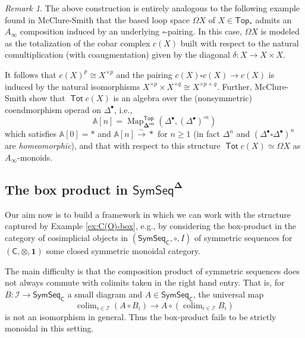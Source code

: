 \documentclass[11pt]{amsart}
\theoremstyle{definition}
\theoremstyle{remark}
\newtheorem{remark}[subsection]{Remark}
\newcommand{\Top}{\mathsf{Top}_*}
\newcommand{\Tot}{\operatorname{\mathsf{Tot}}}
\newcommand{\SymSeq}{\mathsf{SymSeq}}
\newcommand{\Map}{\operatorname{Map}}
\newcommand{\colim}{\operatorname{colim}}
\newcommand{\pt}{*}
\newcommand{\bdel}{\mathbf{\Delta}}
\newcommand{\Dres}{\bdel^{\mathsf{res}}}
\begin{document}
\begin{remark}
    The above construction is entirely analogous to the following example found in McClure-Smith \cite{MS-box} that the based loop space $\Omega X$ of $X\in \Top$ admits an $A_{\infty}$ composition induced by an underlying $\square$-pairing. In this case, $\Omega X$ is modeled as the totalization of the cobar complex $c(X)$ built with respect to the natural comultiplication (with coaugmentation) given by the diagonal $\delta\colon X\to X\times X$. 
    
    It follows that $c(X)^{p}\cong X^{\times p}$ and the pairing $c(X)\square c(X)\to c(X)$ is induced by the natural isomorphisms $X^{\times p}\times X^{\times q}\cong X^{\times p+q}$. Further, McClure-Smith  show that $\Tot c(X)$ is an algebra over the (nonsymmetric) coendmorphism operad on $\Delta^{\bullet}$, i.e., \[ \mathbb{A}[n]=\Map_{\Dres}^{\mathsf{Top}}\left(\Delta^{\bullet}, (\Delta^{\bullet})^{\square n} \right)\] which satisfies $\mathbb{A}[0]=\pt$ and $\mathbb{A}[n]\xrightarrow{\sim} \pt$ for $n\geq 1$ (in fact $\Delta^n$ and $(\Delta^{\bullet} \square \Delta^{\bullet})^n$ are \textit{homeomorphic}), and that with respect to this structure $\Tot c(X)\simeq \Omega X$ as $A_{\infty}$-monoids.  \label{ex:loop-space-A-infty-monoid}
\end{remark}


\subsection{The box product in $\SymSeq^{\bdel}$}
Our aim now is to build a framework in which we can work with the structure captured by Example \ref{ex:C(O)-box}, e.g.,  by considering the box-product in the category of cosimplicial objects in $(\SymSeq_{\mathsf{C}}, \circ, I)$ of symmetric sequences for $(\mathsf{C},\otimes, \mathbf{1})$ some closed symmetric monoidal category. 

The main difficulty is that the composition product of symmetric sequences does not always commute with colimits taken in the right hand entry. That is, for $B\colon \mathcal{I}\to \SymSeq_{\mathsf{C}}$ a small diagram and $A\in \SymSeq_{\mathsf{C}}$, the universal map \begin{equation} \label{eq:colim-circ}\colim_{i\in \mathcal{I}} (A\circ B_i) \to A \circ (\colim_{i\in \mathcal{I}} B_i) \end{equation} is not an isomorphism in general. Thus the box-product fails to be strictly monoidal in this setting. 
\end{document}
